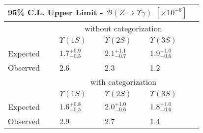
\begin{tabular}{l|llll}
\multicolumn{4}{c}{95\% C.L. Upper Limit - $\mathcal{B}(Z \rightarrow \Upsilon\gamma)$ $[\times10^{-6}]$} \\
\hline
\hline
& \multicolumn{3}{c}{without categorization}      \\
\cline{2-4}
&  $\Upsilon(1S)$ & $\Upsilon(2S)$ & $\Upsilon(3S)$  \\
\hline
Expected     & $1.7^{+0.9}_{-0.5}$ &  $2.1^{+1.1}_{-0.7}$  & $1.9^{+1.0}_{-0.6}$            \\
Observed     & 2.6 &  2.3  & 1.2      \\
\hline
\hline
& \multicolumn{3}{c}{with categorization}      \\
\cline{2-4}
&  $\Upsilon(1S)$ & $\Upsilon(2S)$ & $\Upsilon(3S)$  \\
\hline
Expected     & $1.6^{+0.8}_{-0.5}$ &  $2.0^{+1.0}_{-0.6}$  & $1.8^{+1.0}_{-0.6}$            \\
Observed     & 2.9 &  2.7  & 1.4      \\
\hline
\hline
\end{tabular}
	